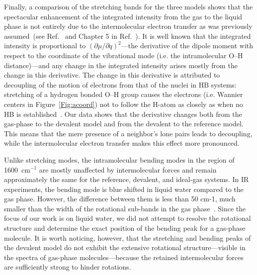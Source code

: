 \documentclass[10pt,amsmath,twocolumn,aps,prl,superscriptaddress,floatfix]{revtex4-1}
\begin{document}

Finally, a comparison of the stretching bands for the three models shows that the spectacular enhancement of the integrated intensity from the gas to the liquid phase is not entirely due to the intermolecular electron transfer as was previously assumed~(see Ref.~ and Chapter 5 in Ref.~). 
It is well known that the integrated intensity is proportional to $\left({\partial \mu}/{\partial q}\right)^2$---the derivative of the dipole moment with respect to the coordinate of the vibrational mode (i.e. the intramolecular O--H distance)---and any change in the integrated intensity arises mostly from the change in this derivative. 
The change in this derivative is attributed to decoupling of the motion of electrons from that of the nuclei in HB systems: stretching of a hydrogen bonded O--H group causes the electrons (i.e. Wannier centers in Figure~\ref{Fig:acoord}) not to follow the H-atom as closely as when no HB is established~\cite{marechal2006hydrogen}. 
Our data shows that the derivative changes both from the gas-phase to the devalent model and from the devalent to the reference model. 
This means that the mere presence of a neighbor's lone pairs leads to decoupling, while the intermolecular electron transfer makes this effect more pronounced.


Unlike stretching modes, the intramolecular bending modes in the region of 1600~cm$^{-1}$ are mostly unaffected by intermolecular forces and remain approximately the same for the reference, devalent, and ideal-gas systems. 
In IR experiments, the bending mode is blue shifted in liquid water compared to the gas phase. However, the difference between them is less than 50 cm-1, much smaller than the width of the rotational sub-bands in the gas phase~\cite{marechal2006hydrogen}. Since the focus of our work is on liquid water, we did not attempt to resolve the rotational structure and determine the exact position of the bending peak for a gas-phase molecule.
It is worth noticing, however, that the stretching and bending peaks of the devalent model do not exhibit the extensive rotational structure---visible in the spectra of gas-phase molecules---because the retained intermolecular forces are sufficiently strong to hinder rotations.
\end{document}
